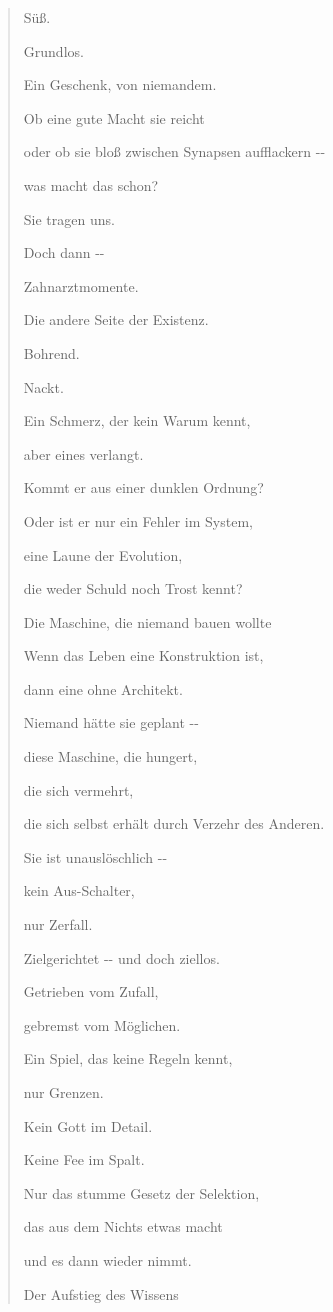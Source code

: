 \documentclass[
  ngerman,
]{article}
\begin{document}
\begin{quote}
Süß.

Grundlos.

Ein Geschenk, von niemandem.

Ob eine gute Macht sie reicht

oder ob sie bloß zwischen Synapsen aufflackern -\/-

was macht das schon?

Sie tragen uns.

Doch dann -\/-

Zahnarztmomente.

Die andere Seite der Existenz.

Bohrend.

Nackt.

Ein Schmerz, der kein Warum kennt,

aber eines verlangt.

Kommt er aus einer dunklen Ordnung?

Oder ist er nur ein Fehler im System,

eine Laune der Evolution,

die weder Schuld noch Trost kennt?

Die Maschine, die niemand bauen wollte

Wenn das Leben eine Konstruktion ist,

dann eine ohne Architekt.

Niemand hätte sie geplant -\/-

diese Maschine, die hungert,

die sich vermehrt,

die sich selbst erhält durch Verzehr des Anderen.

Sie ist unauslöschlich -\/-

kein Aus-Schalter,

nur Zerfall.

Zielgerichtet -\/- und doch ziellos.

Getrieben vom Zufall,

gebremst vom Möglichen.

Ein Spiel, das keine Regeln kennt,

nur Grenzen.

Kein Gott im Detail.

Keine Fee im Spalt.

Nur das stumme Gesetz der Selektion,

das aus dem Nichts etwas macht

und es dann wieder nimmt.

Der Aufstieg des Wissens


\end{quote}
\end{document}
